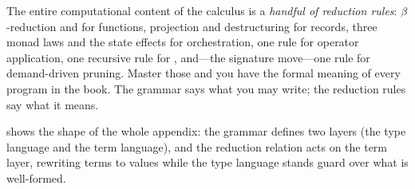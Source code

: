 \begin{keyidea}
The entire computational content of the calculus is a \emph{handful of reduction
rules}: $\beta$-reduction and  for functions, projection and
destructuring for records, three monad laws and the state effects for
orchestration, one rule for operator application, one recursive rule for
, and---the signature move---one rule for demand-driven
pruning. Master those and you have the formal meaning of every program in the
book. The grammar says what you may write; the reduction rules say what it means.
\end{keyidea}

 shows the shape of the whole appendix: the grammar
defines two layers (the type language and the term language), and the reduction
relation acts on the term layer, rewriting terms to values while the type
language stands guard over what is well-formed.

